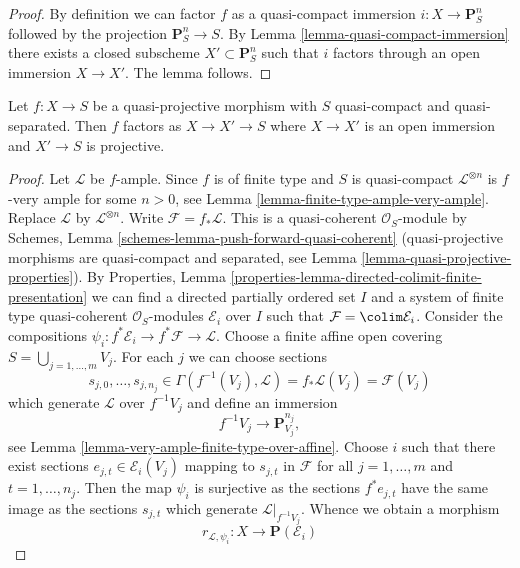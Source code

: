 \begin{proof}
By definition we can factor $f$ as a quasi-compact immersion
$i : X \to \mathbf{P}^n_S$ followed by the projection $\mathbf{P}^n_S \to S$.
By Lemma \ref{lemma-quasi-compact-immersion} there exists a closed
subscheme $X' \subset \mathbf{P}^n_S$ such that $i$ factors through
an open immersion $X \to X'$. The lemma follows.
\end{proof}

\begin{lemma}
\label{lemma-quasi-projective-open-projective}
Let $f : X \to S$ be a quasi-projective morphism with $S$ quasi-compact
and quasi-separated. Then $f$ factors as $X \to X' \to S$ where $X \to X'$
is an open immersion and $X' \to S$ is projective.
\end{lemma}

\begin{proof}
Let $\mathcal{L}$ be $f$-ample. Since $f$ is of finite type and $S$ is
quasi-compact $\mathcal{L}^{\otimes n}$ is $f$-very ample for some $n > 0$, see
Lemma \ref{lemma-finite-type-ample-very-ample}.
Replace $\mathcal{L}$ by $\mathcal{L}^{\otimes n}$.
Write $\mathcal{F} = f_*\mathcal{L}$. This is a quasi-coherent
$\mathcal{O}_S$-module by 
Schemes, Lemma \ref{schemes-lemma-push-forward-quasi-coherent}
(quasi-projective morphisms are quasi-compact and
separated, see Lemma \ref{lemma-quasi-projective-properties}). By
Properties, Lemma \ref{properties-lemma-directed-colimit-finite-presentation}
we can find a directed partially ordered set $I$ and a system of
finite type quasi-coherent $\mathcal{O}_S$-modules $\mathcal{E}_i$
over $I$ such that $\mathcal{F} = \colim \mathcal{E}_i$.
Consider the compositions
$\psi_i : f^*\mathcal{E}_i \to f^*\mathcal{F} \to \mathcal{L}$.
Choose a finite affine open covering $S = \bigcup_{j = 1, \ldots, m} V_j$.
For each $j$ we can choose sections
$$
s_{j, 0}, \ldots, s_{j, n_j} \in
\Gamma(f^{-1}(V_j), \mathcal{L}) = f_*\mathcal{L}(V_j) = \mathcal{F}(V_j)
$$
which generate $\mathcal{L}$ over $f^{-1}V_j$ and define an immersion
$$
f^{-1}V_j \longrightarrow \mathbf{P}^{n_j}_{V_j},
$$
see Lemma \ref{lemma-very-ample-finite-type-over-affine}.
Choose $i$ such that there exist sections $e_{j, t} \in \mathcal{E}_i(V_j)$
mapping to $s_{j, t}$ in $\mathcal{F}$ for all $j = 1, \ldots, m$ and
$t = 1, \ldots, n_j$. Then the map $\psi_i$ is surjective
as the sections $f^*e_{j, t}$ have the same image as the sections $s_{j, t}$
which generate $\mathcal{L}|_{f^{-1}V_j}$. Whence we obtain a morphism
$$
r_{\mathcal{L}, \psi_i} : X \longrightarrow \mathbf{P}(\mathcal{E}_i)
$$
\end{proof}
